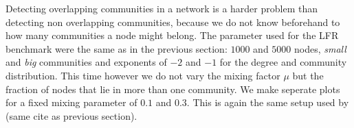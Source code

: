 Detecting overlapping communities in a network is a harder problem than detecting non overlapping communities, because we do not know beforehand to how many communities a node might belong. The parameter used for the LFR benchmark were the same as in the previous section: $1000$ and $5000$ nodes, \textit{small} and \textit{big} communities and exponents of $-2$ and $-1$ for the degree and community distribution. This time however we do not vary the mixing factor $\mu$ but the fraction of nodes that lie in more than one community. We make seperate plots for a fixed mixing parameter of $0.1$ and $0.3$. This is again the same setup used by (same cite as previous section).

